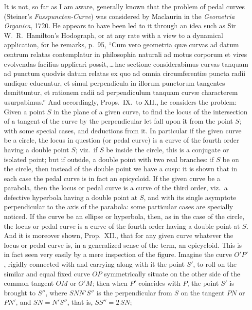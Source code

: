 \documentclass[11pt,a4paper]{article}
\theoremstyle{plain}
\begin{document}
\medskip

It is not, so far as I am aware, generally known that the problem of pedal curves (Steiner's \textit{Fusspuncten-Curve}) was considered by Maclaurin in the \textit{Geometria Organica}, 1720. He appears to have been led to it through an idea such as Sir W.~R.\ Hamilton's Hodograph, or at any rate with a view to a dynamical application, for he remarks, p.~95, ``Cum vero geometria qu\ae{} curvas ad datum centrum relatas contemplatur in philosophia naturali ad motus corporum et vires evolvendas facilius applicari possit,\,\ldots\,hac sectione considerabimus curvas tanquam ad punctum quodvis datum relatas ex quo ad omnia circumferenti\ae{} puncta radii undique educuntur, et simul perpendicula in illorum punctorum tangentes demittuntur, et rationem radii ad perpendiculum tanquam curv\ae{} characterem usurpabimus.'' And accordingly, Props.\ IX.\ to XII., he considers the problem: Given a point $S$ in the plane of a given curve, to find the locus of the intersection of a tangent of the curve by the perpendicular let fall upon it from the point $S$; with some special cases, and deductions from it. In particular if the given curve be a circle, the locus in question (or pedal curve) is a curve of the fourth order having a double point $S$; viz.\ if $S$ be inside the circle, this is a conjugate or isolated point; but if outside, a double point with two real branches: if $S$ be on the circle, then instead of the double point we have a cusp: it is shown that in each case the pedal curve is in fact an epicycloid. If the given curve be a parabola, then the locus or pedal curve is a curve of the third order, viz.\ a defective hyperbola having a double point at $S$, and with its single asymptote perpendicular to the axis of the parabola: some particular cases are specially noticed. If the curve be an ellipse or hyperbola, then, as in the case of the circle, the locus or pedal curve is a curve of the fourth order having a double point at $S$. And it is moreover shown, Prop.\ XII., that for any given curve whatever the locus or pedal curve is, in a generalized sense of the term, an epicycloid. This is in fact seen very easily by a mere inspection of the figure. Imagine the curve $O'P'$, rigidly connected with and
\newpage
carrying along with it the point $S'$, to roll on the similar and equal fixed curve $OP$ symmetrically situate on the other side of the common tangent $OM$ or $O'M$; then when $P'$ coincides with $P$, the point $S'$ is brought to $S''$, where $SNN'S''$ is the perpendicular from $S$ on the tangent $PN$ or $PN'$, and $SN = N'S''$, that is, $SS'' = 2\,SN$;
\end{document}
